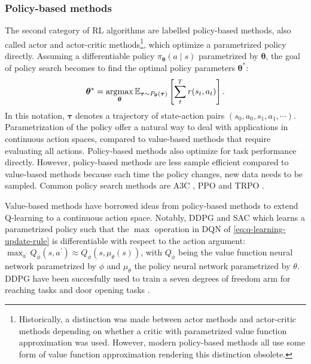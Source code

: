 \documentclass[\home/main.tex]{subfiles}
\begin{document}
\subsubsection{Policy-based methods}
The second category of RL algorithms are labelled policy-based methods, also called actor and actor-critic methods\footnote{Historically, a distinction was made between actor methods and actor-critic methods depending on whether a critic with parametrized value function approximation was used. However, modern policy-based methods all use some form of value function approximation rendering this distinction obsolete.}, which optimize a parametrized policy directly. Assuming a differentiable policy $\pi_{\boldsymbol{\theta}}(a \mid s)$ parametrized by $\boldsymbol{\theta}$, the goal of policy search becomes to find the optimal policy parameters $\boldsymbol{\theta}^{*}$:
\begin{equation} \label{eq:policy-max}
	\boldsymbol{\theta}^{*} = \operatorname*{\arg\!\max}_{\boldsymbol{\theta}} \mathbb{E}_{\boldsymbol{\tau} \sim P_{\boldsymbol{\theta}}(\boldsymbol{\tau}) } \left[ \sum_{t}^{T} r(s_t, a_t) \right].
\end{equation}
In this notation, $\boldsymbol{\tau}$ denotes a trajectory of state-action pairs $(s_0, a_0, s_1, a_1, \cdots)$. Parametrization of the policy offer a natural way to deal with applications in continuous action spaces, compared to value-based methods that require evaluating all actions. Policy-based methods also optimize for task performance directly. However, policy-based methods are less sample efficient compared to value-based methods because each time the policy changes, new data needs to be sampled. Common policy search methods are A3C \autocite{mnih2016asynchronous}, PPO \autocite{schulman2017proximal} and TRPO \autocite{schulman2015trust}.

Value-based methods have borrowed ideas from policy-based methods to extend Q-learning to a continuous action space. Notably, DDPG \autocite{lillicrap2015continuous} and SAC \autocite{haarnoja2018soft} which learns a parametrized policy such that the $\max$ operation in \gls{DQN} of \cref{eq:q-learning-update-rule} is differentiable with respect to the action argument: $\max_{a^{\prime}} Q_{\phi}(s, a^{\prime}) \approx Q_{\phi} (s, \mu_{\theta}(s))$, with $Q_{\phi}$ being the value function neural network parametrized by $\phi$ and $\mu_{\theta}$ the policy neural network parametrized by $\theta$. DDPG have been succesfully used to  train a seven degrees of freedom arm for reaching tasks and door opening tasks \autocite{gu2017deep}.
\end{document}

